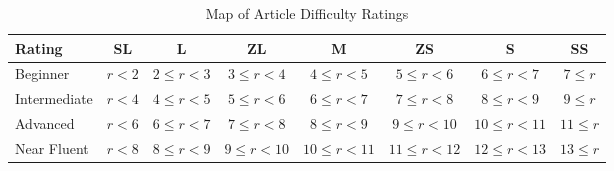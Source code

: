 \begin{table}
\centering
\caption{Map of Article Difficulty Ratings}
\label{tbl:ratings}
\begin{tabu} to \textwidth{|l|c|c|c|c|c|c|c|}
\hline
\textbf{Rating} & \textbf{SL}      & \textbf{L}       & \textbf{ZL}   & \textbf{M}    & \textbf{ZS}   & \textbf{S}  & \textbf{SS}   \\ \hline
Beginner                  & $ r < 2 $ & $ 2 \leq r < 3 $ & $ 3 \leq r < 4 $ & $ 4 \leq r < 5 $ & $ 5 \leq r < 6 $  & $ 6 \leq r < 7 $ & $ 7 \leq r $    \\ \hline
Intermediate              & $ r < 4 $ & $ 4 \leq r < 5 $ & $ 5 \leq r < 6 $ & $ 6 \leq r < 7 $ & $ 7 \leq r < 8 $  & $ 8 \leq r < 9 $ & $ 9 \leq r $    \\ \hline
Advanced                  & $ r < 6 $ & $ 6 \leq r < 7 $ & $ 7 \leq r < 8 $ & $ 8 \leq r < 9 $ & $ 9 \leq r < 10 $  & $ 10 \leq r < 11 $ & $ 11 \leq r $    \\ \hline
Near Fluent             & $ r < 8 $ & $ 8 \leq r < 9 $ & $ 9 \leq r < 10 $ & $ 10 \leq r < 11 $ & $ 11 \leq r < 12 $  & $ 12 \leq r < 13 $ & $ 13 \leq r $    \\ \hline
\end{tabu}
\end{table}